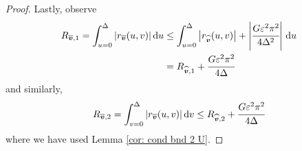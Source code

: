 \begin{proof}
	Lastly, observe 
	\begin{align*}
		R_{\overline{\boldsymbol v},1} = \int_{u=0}^\Delta |r_{\overline{\boldsymbol v}} (u,v) |\, \mathrm{d} u 
		&\leq \int_{u=0}^\Delta \left|r_{{\widehat{\boldsymbol v}}} (u,v) \right| + \left|\cfrac{G \varepsilon^2 \pi^2}{4\Delta^2}\right| \, \mathrm{d} u
		\\& = R_{{{\widehat{\boldsymbol v}}},1} + \cfrac{G \varepsilon^2 \pi^2}{4\Delta}
	\end{align*}
	and similarly, 
	\[R_{\overline{\boldsymbol v},2} = \int_{v=0}^\Delta |r_{\overline{\boldsymbol v}} (u,v) |\, \mathrm{d} v \leq R_{{{\widehat{\boldsymbol v}}},2} + \cfrac{G \varepsilon^2 \pi^2}{4\Delta}\]
	where we have used Lemma \ref{cor: cond bnd 2 U}. 
\end{proof}
